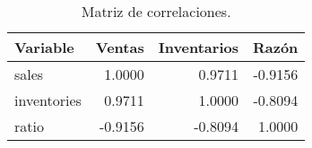 \begin{table}
\caption{Matriz de correlaciones.}
\label{tab:ex8_corr}
\begin{tabular}{lrrr}
\toprule
Variable & Ventas & Inventarios & Razón \\
\midrule
sales & 1.0000 & 0.9711 & -0.9156 \\
inventories & 0.9711 & 1.0000 & -0.8094 \\
ratio & -0.9156 & -0.8094 & 1.0000 \\
\bottomrule
\end{tabular}
\end{table}
